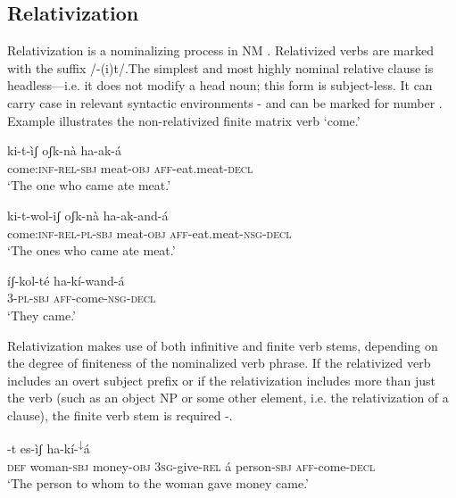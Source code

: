 \documentclass[output=paper]{langsci/langscibook}
\begin{document}
\subsection{Relativization}\label{sec:mahland:2.2}

Relativization is a nominalizing process in NM \citep[225]{Ahland2012}. Relativized verbs are marked with the suffix /-(i)t/.The simplest and most highly nominal relative clause is headless—i.e. it does not modify a head noun; this form is subject-less. It can carry case in relevant syntactic environments - and can be marked for number . Example  illustrates the non-relativized finite matrix verb `come.' 

\ea\label{ex:mahland:40}
\gll ki-t-\`{i}ʃ                    oʃk-n\`{a}      ha-ak-\'{a}  \\
come:\textsc{inf-rel-sbj}   meat-\textsc{obj   aff-}eat.meat-\textsc{decl}\\
\glt `The one who came ate meat.'
\z

\ea\label{ex:mahland:41}
\gll ki-t-wol-iʃ           oʃk-n\`{a}       ha-ak-and-\'{a}\\
come:\textsc{inf-rel-pl-sbj}   meat-\textsc{obj   aff-}eat.meat-\textsc{nsg-decl} \\
\glt `The ones who came ate meat.' 
\z

\ea\label{ex:mahland:42}
\gll \'{i}ʃ-kol-t\'{e}    ha-k\'{i}-wand-\'{a} \\
\textsc{3-pl-sbj   aff}{}-come-\textsc{nsg-decl} \\
\glt `They came.'
\z

Relativization makes use of both infinitive and finite verb stems, depending on the degree of finiteness of the nominalized verb phrase. If the relativized verb includes an overt subject prefix or if the relativization includes more than just the verb (such as an object NP or some other element, i.e. the relativization of a clause), the finite verb stem is required -. 


\ea\label{ex:mahland:43}
-t  es-\`{i}ʃ           ha-k\'{i}-\textsuperscript{↓}\'{a}
\\
\textsc{def     }woman\textsc{{}-sbj}   money\textsc{{}-obj}   \textsc{3sg}{}-give\textsc{{}-rel}  \'{a} person\textsc{{}-sbj}   \textsc{aff}{}-come-\textsc{decl} \\
\glt `The person to whom to the woman gave money came.'
\z
\end{document}
